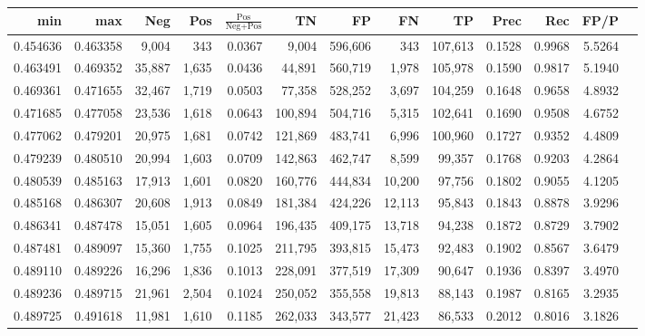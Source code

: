 \begin{tabular}{rrrrrrrrrrrrr}
\toprule
     min &      max &    Neg &   Pos & $\frac{\text{Pos}}{\text{Neg}+\text{Pos}}$ &      TN &      FP &      FN &      TP &   Prec &    Rec &   FP/P \\
\midrule
0.454636 & 0.463358 &  9,004 &   343 &                                     0.0367 &   9,004 & 596,606 &     343 & 107,613 & 0.1528 & 0.9968 & 5.5264 \\
0.463491 & 0.469352 & 35,887 & 1,635 &                                     0.0436 &  44,891 & 560,719 &   1,978 & 105,978 & 0.1590 & 0.9817 & 5.1940 \\
0.469361 & 0.471655 & 32,467 & 1,719 &                                     0.0503 &  77,358 & 528,252 &   3,697 & 104,259 & 0.1648 & 0.9658 & 4.8932 \\
0.471685 & 0.477058 & 23,536 & 1,618 &                                     0.0643 & 100,894 & 504,716 &   5,315 & 102,641 & 0.1690 & 0.9508 & 4.6752 \\
0.477062 & 0.479201 & 20,975 & 1,681 &                                     0.0742 & 121,869 & 483,741 &   6,996 & 100,960 & 0.1727 & 0.9352 & 4.4809 \\
0.479239 & 0.480510 & 20,994 & 1,603 &                                     0.0709 & 142,863 & 462,747 &   8,599 &  99,357 & 0.1768 & 0.9203 & 4.2864 \\
0.480539 & 0.485163 & 17,913 & 1,601 &                                     0.0820 & 160,776 & 444,834 &  10,200 &  97,756 & 0.1802 & 0.9055 & 4.1205 \\
0.485168 & 0.486307 & 20,608 & 1,913 &                                     0.0849 & 181,384 & 424,226 &  12,113 &  95,843 & 0.1843 & 0.8878 & 3.9296 \\
0.486341 & 0.487478 & 15,051 & 1,605 &                                     0.0964 & 196,435 & 409,175 &  13,718 &  94,238 & 0.1872 & 0.8729 & 3.7902 \\
0.487481 & 0.489097 & 15,360 & 1,755 &                                     0.1025 & 211,795 & 393,815 &  15,473 &  92,483 & 0.1902 & 0.8567 & 3.6479 \\
0.489110 & 0.489226 & 16,296 & 1,836 &                                     0.1013 & 228,091 & 377,519 &  17,309 &  90,647 & 0.1936 & 0.8397 & 3.4970 \\
0.489236 & 0.489715 & 21,961 & 2,504 &                                     0.1024 & 250,052 & 355,558 &  19,813 &  88,143 & 0.1987 & 0.8165 & 3.2935 \\
0.489725 & 0.491618 & 11,981 & 1,610 &                                     0.1185 & 262,033 & 343,577 &  21,423 &  86,533 & 0.2012 & 0.8016 & 3.1826 \\

\end{tabular}
